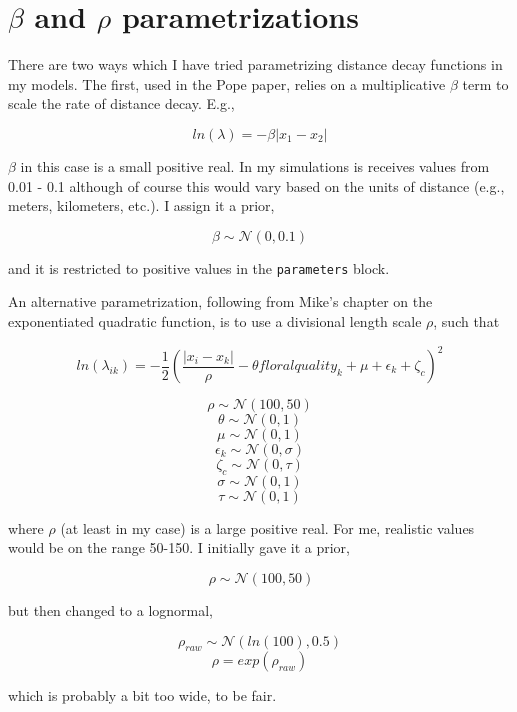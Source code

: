 \documentclass[12pt]{article}
\begin{document}
\section{$\beta$ and $\rho$ parametrizations}

There are two ways which I have tried parametrizing distance decay functions in my models. The first, used in the Pope paper, relies on a multiplicative $\beta$ term to scale the rate of distance decay. E.g.,

\[ln(\lambda) = -\beta |x_1 - x_2|\]

$\beta$ in this case is a small positive real. In my simulations is receives values from 0.01 - 0.1 although of course this would vary based on the units of distance (e.g., meters, kilometers, etc.). I assign it a prior,

\[
\beta \sim \mathcal{N}(0, 0.1)
\]

and it is restricted to positive values in the \texttt{parameters} block.

An alternative parametrization, following from Mike's chapter on the exponentiated quadratic function, is to use a divisional length scale $\rho$, such that

\[ln(\lambda_{ik}) = -\frac{1}{2}\left(\frac{|x_i - x_k|}{\rho} - \theta floralquality_k + \mu + \epsilon_k + \zeta_c\right)^2\]

\[ \rho \sim \mathcal{N}(100, 50)\]
\[ \theta \sim \mathcal{N}(0, 1)\]
\[ \mu \sim \mathcal{N}(0, 1)\]
\[ \epsilon_k \sim \mathcal{N}(0, \sigma)\]
\[ \zeta_c \sim \mathcal{N}(0, \tau)\]
\[ \sigma \sim \mathcal{N}(0, 1)\]
\[ \tau \sim \mathcal{N}(0, 1)\]

where $\rho$ (at least in my case) is a large positive real. For me, realistic values would be on the range 50-150. I initially gave it a prior,

\[\ \rho \sim \mathcal{N}(100, 50)\]

but then changed to a lognormal,

\[ \rho_{raw} \sim \mathcal{N}(ln(100), 0.5) \]
\[ \rho = exp(\rho_{raw}) \]



which is probably a bit too wide, to be fair.
\end{document}

